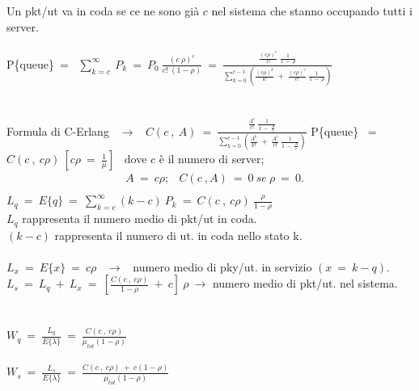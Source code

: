 \documentclass[12pt,a4paper]{article}
\begin{document}
    Un pkt/ut va in coda se ce ne sono già $c$ nel sistema che stanno occupando tutti i server. \\ \\
    P\{queue\}\ = \ $\sum^{\infty}_{k=c} \ P_{k}\ = \ P_{0} \ \frac{(c \ \rho)^{c}}{c! \ (1 - \rho)} \ = \ \frac{\frac{(c \rho)^{c}}{c!} \ \frac{1}{1 \ - \ \rho}}{\sum^{c-1}_{k=0}(\frac{(c \rho)^{k}}{k!} \ + \ \frac{(c \rho)^{c}}{c!} \ \frac{1}{1 \ - \ \rho})}$ \\ \\ \\
    Formula di C-Erlang \ $\rightarrow$ \ $C(c \ , \ A) \ = \ \frac{\frac{A^{c}}{c!} \ \frac{1}{1 \ - \ \frac{A}{c}}}{\sum^{c-1}_{k=0}(\frac{A^{k}}{k!}\ + \ \frac{A^{c}}{c!} \ \frac{1}{1 \ - \ \frac{A}{c}})}$
    \newpage
    P\{queue\} \ = \ $C(c \ , \ c\rho) \ [c\rho \ = \ \frac{1}{\mu}]$ \ dove $c$ è il numero di server; \\
    \begin{align*}
    &A \ = \ c\rho; 
    &C(c \ , A) \ = \ 0 \ se \ \rho \ = \ 0. \\
    \end{align*}
    $L_{q} \ = \ E\{q\} \ = \ \sum^{\infty}_{k=c}(k-c) \ P_{k} \ = \ C(c \ , \ c\rho) \ \frac{\rho}{1-\rho}$ \\ 
    $L_{q}$ rappresenta il numero medio di pkt/ut in coda.\\
    $(k-c)$ rappresenta il numero di ut. in coda nello stato k.\\ \\
    $L_{x} \ = \ E\{x\} \ = \ c\rho$ \ $\rightarrow$ \ numero medio di pky/ut. in servizio $(x \ = \ k-q)$.
    $L_{s} \ = \ L_{q} \ + \ L_{x} \ = \ [\frac{C(c \ , \ c\rho)}{1-\rho} \ + \ c]\ \rho \ \rightarrow$ numero medio di pkt/ut. nel sistema. \\ \\ \\
    $W_{q} \ = \ \frac{L_{q}}{E\{\lambda\}} \ = \ \frac{C(c \ , \ c\rho)}{\mu_{tot}(1-\rho)}$ \\ \\
    $W_{s} \ = \ \frac{L_{s}}{E\{\lambda\}} \ = \ \frac{C(c \ , \ c\rho) \ + \ c(1-\rho)}{\mu_{tot}(1-\rho)}$ \\ 
    
\end{document}
